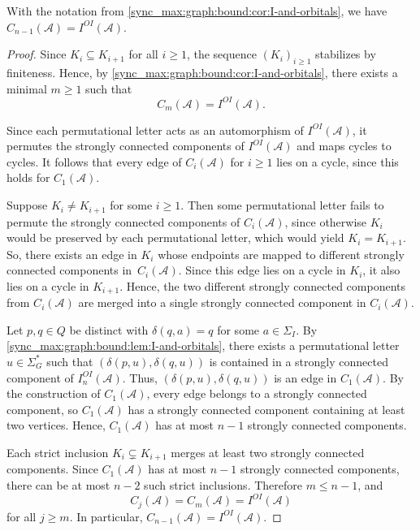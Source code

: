 \begin{lemma} \label{sync_max:graph:bound:lem:cycle-graph-stabilizes}
	With the notation from \cref{sync_max:graph:bound:cor:I-and-orbitals},
	we have $C_{n - 1}(\mathcal A) = I^{OI}(\mathcal A)$.
\end{lemma}
\begin{proof}
	Since $K_i \subseteq K_{i+1}$ for all $i \ge 1$, the sequence
	$(K_i)_{i \ge 1}$ stabilizes by finiteness. Hence, by
	\cref{sync_max:graph:bound:cor:I-and-orbitals}, there exists a minimal
	$m \ge 1$ such that
	\[
	C_m(\mathcal A)=I^{OI}(\mathcal A).
	\]
	
	Since each permutational letter acts as an automorphism of
$I^{OI}(\mathcal A)$, it permutes the strongly connected components of
$I^{OI}(\mathcal A)$ and maps cycles to cycles. It follows that every
edge of $C_i(\mathcal A)$ for $i \ge 1$ lies on a cycle, since this holds for
$C_1(\mathcal A)$.
	
	Suppose $K_i \ne K_{i+1}$ for some $i \ge 1$.
	Then some permutational letter fails to permute the strongly connected components of $C_i(\mathcal A)$,
	since otherwise $K_i$ would be preserved by each permutational letter, which
	would yield $K_i = K_{i+1}$.
	So, there exists an edge in $K_i$
	whose endpoints are mapped to different strongly connected components
	in~$C_i(\mathcal A)$.
	Since this edge lies on a cycle in $K_i$, it also lies on a
	cycle in $K_{i+1}$.
	Hence, the two different strongly connected components from $C_i(\mathcal A)$
	are merged into a single strongly connected component in $C_i(\mathcal A)$.
			
	Let $p, q \in Q$ be distinct with $\delta(q, a) = q$ for some $a \in \Sigma_I$.
	By \cref{sync_max:graph:bound:lem:I-and-orbitals},
	there exists a permutational letter $u \in \Sigma_G^*$
	such that $(\delta(p, u), \delta(q, u))$
	is contained in a strongly connected component of $I_n^{OI}(\mathcal A)$.
	Thus, $(\delta(p, u), \delta(q, u))$ is an edge in $C_1(\mathcal A)$.
	By the
	construction of $C_1(\mathcal A)$, every edge belongs to a strongly
	connected component, so $C_1(\mathcal A)$ has a strongly connected
	component containing at least two vertices. Hence,
	$C_1(\mathcal A)$ has at most $n-1$ strongly connected components.	
	
	Each strict inclusion $K_i \subsetneq K_{i+1}$ merges at least two
	strongly connected components. Since $C_1(\mathcal A)$ has at most
	$n-1$ strongly connected components, there can be at most $n-2$ such
	strict inclusions. Therefore $m \le n-1$, and
	\[
	C_j(\mathcal A)=C_m(\mathcal A)=I^{OI}(\mathcal A)
	\]
	for all $j \ge m$. In particular,
	$
	C_{n-1}(\mathcal A)=I^{OI}(\mathcal A).
	$
\end{proof}

